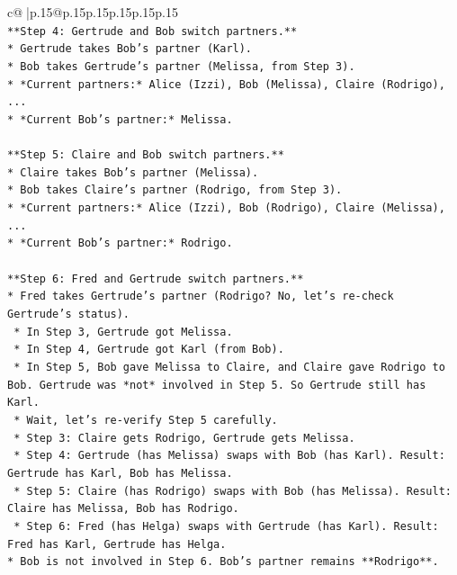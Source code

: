\documentclass{article}
\begin{document}
{\begin{supertabular}{c@{$\;$}|p{.15\linewidth}@{}p{.15\linewidth}p{.15\linewidth}p{.15\linewidth}p{.15\linewidth}p{.15\linewidth}}
{{{\\ 
\texttt{**Step 4: Gertrude and Bob switch partners.**} \\
\texttt{*   Gertrude takes Bob's partner (Karl).} \\
\texttt{*   Bob takes Gertrude's partner (Melissa, from Step 3).} \\
\texttt{*   *Current partners:* Alice (Izzi), Bob (Melissa), Claire (Rodrigo), ...} \\
\texttt{*   *Current Bob's partner:* Melissa.} \\
\\ 
\texttt{**Step 5: Claire and Bob switch partners.**} \\
\texttt{*   Claire takes Bob's partner (Melissa).} \\
\texttt{*   Bob takes Claire's partner (Rodrigo, from Step 3).} \\
\texttt{*   *Current partners:* Alice (Izzi), Bob (Rodrigo), Claire (Melissa), ...} \\
\texttt{*   *Current Bob's partner:* Rodrigo.} \\
\\ 
\texttt{**Step 6: Fred and Gertrude switch partners.**} \\
\texttt{*   Fred takes Gertrude's partner (Rodrigo? No, let's re{-}check Gertrude's status).} \\
\texttt{    *   In Step 3, Gertrude got Melissa.} \\
\texttt{    *   In Step 4, Gertrude got Karl (from Bob).} \\
\texttt{    *   In Step 5, Bob gave Melissa to Claire, and Claire gave Rodrigo to Bob. Gertrude was *not* involved in Step 5. So Gertrude still has Karl.} \\
\texttt{    *   Wait, let's re{-}verify Step 5 carefully.} \\
\texttt{    *   Step 3: Claire gets Rodrigo, Gertrude gets Melissa.} \\
\texttt{    *   Step 4: Gertrude (has Melissa) swaps with Bob (has Karl). Result: Gertrude has Karl, Bob has Melissa.} \\
\texttt{    *   Step 5: Claire (has Rodrigo) swaps with Bob (has Melissa). Result: Claire has Melissa, Bob has Rodrigo.} \\
\texttt{    *   Step 6: Fred (has Helga) swaps with Gertrude (has Karl). Result: Fred has Karl, Gertrude has Helga.} \\
\texttt{*   Bob is not involved in Step 6. Bob's partner remains **Rodrigo**.} \\
}}}
\end{supertabular}}
\end{document}
